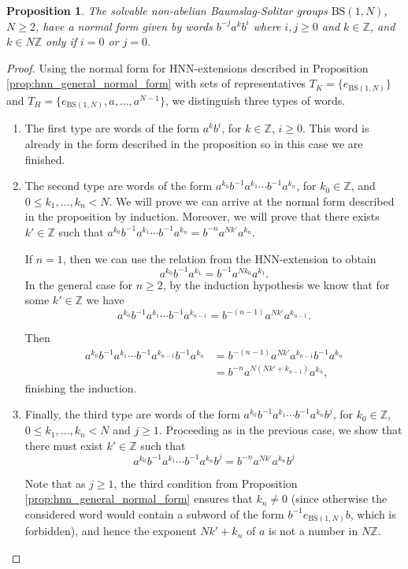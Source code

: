 \documentclass[letterpaper,10pt]{amsart}
\theoremstyle{plain}
\newtheorem{proposition}[theorem]{Proposition}
\newcommand{\BS}[1][N]{\mathrm{BS}(1,#1)}
\begin{document}
\begin{proposition}\label{prop:normalform_bsgroups}
	The solvable non-abelian Baumslag-Solitar groups $\BS$, $N\ge 2$, have a normal form given by words $b^{-j}a^kb^{i}$ where $i,j\ge 0$ and $k\in \mathbb{Z}$, and $k\in N\mathbb{Z}$ only if $i=0$ or $j=0$.
\end{proposition}

\begin{proof}
	Using the normal form for HNN-extensions described in Proposition \ref{prop:hnn_general_normal_form} with sets of representatives $T_K=\{e_{\BS}\}$ and $T_H=\{e_{\BS},a,\ldots,a^{N-1}\}$, we distinguish three types of words.
	
	\begin{enumerate}[1.]
		\item The first type are words of the form $a^kb^i$, for $k\in\mathbb{Z} $, $i\ge 0$. This word is already in the form described in the proposition so in this case we are finished.
		\item The second type are words of the form $a^{k_0}b^{-1}a^{k_1}\cdots b^{-1}a^{k_n}$, for $k_0\in \mathbb{Z}$, and $0\le k_1,\ldots,k_n<N$. We will prove we can arrive at the normal form described in the proposition by induction. Moreover, we will prove that there exists $k'\in \mathbb{Z}$ such that $a^{k_0}b^{-1}a^{k_1}\cdots b^{-1}a^{k_n}=b^{-n}a^{Nk'}a^{k_n}$. 
		
		If $n=1$, then we can use the relation from the HNN-extension to obtain
		$$
		a^{k_0}b^{-1}a^{k_1}=b^{-1}a^{Nk_0}a^{k_1}.
		$$
		In the general case for $n\ge 2$, by the induction hypothesis we know that for some $k'\in \mathbb{Z}$ we have $$a^{k_0}b^{-1}a^{k_1}\cdots b^{-1}a^{k_{n-1}}=b^{-(n-1)}a^{Nk'}a^{k_{n-1}}.$$
		
		Then
		\begin{align*}
	a^{k_0}b^{-1}a^{k_1}\cdots b^{-1}a^{k_{n-1}}b^{-1}a^{k_n}&=b^{-(n-1)}a^{Nk'}a^{k_{n-1}}b^{-1}a^{k_n}\\
		&=b^{-n}a^{N(Nk'+k_{n-1})}a^{k_n},
		\end{align*}
		finishing the induction.
		\item Finally, the third type are words of the form $a^{k_0}b^{-1}a^{k_1}\cdots b^{-1}a^{k_n}b^{j}$, for $k_0\in \mathbb{Z}$, $0\le k_1,\ldots,k_n<N$ and $j\ge 1$. Proceeding as in the previous case, we show that there must exist $k'\in \mathbb{Z}$ such that
		$$
		a^{k_0}b^{-1}a^{k_1}\cdots b^{-1}a^{k_n}b^{j}=b^{-n}a^{Nk'}a^{k_n}b^{j}
		$$
		
		Note that as $j\ge 1$, the third condition from Proposition \ref{prop:hnn_general_normal_form} ensures that $k_n\neq 0$ (since otherwise the considered word would contain a subword of the form $b^{-1}e_{\BS}b$, which is forbidden), and hence the exponent $Nk'+k_n$ of $a$ is not a number in $N\mathbb{Z}$.
	\end{enumerate}
\end{proof}
\end{document}
